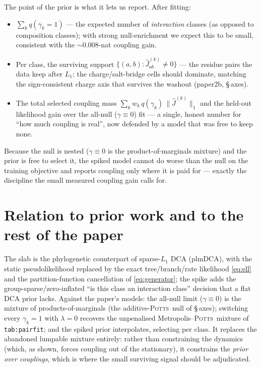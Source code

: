\documentclass[11pt]{article}
\newcommand{\Potts}{\textsc{Potts}}
\begin{document}
The point of the prior is what it lets us report. After fitting:
\begin{itemize}
\item $\sum_k q(\gamma_k{=}1)$ --- the expected number of \emph{interaction} classes (as
opposed to composition classes); with strong null-enrichment we expect this to be small,
consistent with the $\sim$$0.008$-nat coupling gain.
\item Per class, the surviving support $\{(a,b):\hat J^{(k)}_{ab}\ne0\}$ --- the residue
pairs the data keep after $L_1$; the charge/salt-bridge cells should dominate, matching
the sign-consistent charge axis that survives the washout (paper2b, \S\,axes).
\item The total selected coupling mass $\sum_k w_k\,q(\gamma_k)\,\|\hat J^{(k)}\|_1$ and the
held-out likelihood gain over the all-null ($\gamma\equiv0$) fit --- a single, honest
number for ``how much coupling is real'', now defended by a model that was free to keep
none.
\end{itemize}
Because the null is nested ($\gamma\equiv0$ is the product-of-marginals mixture) and the
prior is free to select it, the spiked model cannot do worse than the null on the training
objective and reports coupling only where it is paid for --- exactly the discipline the
small measured coupling gain calls for.

\section{Relation to prior work and to the rest of the paper}

The slab is the phylogenetic counterpart of sparse-$L_1$ DCA (plmDCA), with the static
pseudolikelihood replaced by the exact tree/branch/rate likelihood \eqref{eq:ell} and the
partition-function cancellation of \eqref{eq:generator}; the spike adds the
group-sparse/zero-inflated ``is this class an interaction class'' decision that a flat DCA
prior lacks. Against the paper's models: the all-null limit ($\gamma\equiv0$) is the
mixture of products-of-marginals (the additive-\Potts\ null of \S\,axes); switching every
$\gamma_k{=}1$ with $\lambda{=}0$ recovers the unpenalised Metropolis--\Potts\ mixture of
\texttt{tab:pairfit}; and the spiked prior interpolates, selecting per class. It replaces
the abandoned lumpable mixture entirely: rather than constraining the dynamics (which, as
shown, forces coupling out of the stationary), it constrains the \emph{prior over
couplings}, which is where the small surviving signal should be adjudicated.
\end{document}
